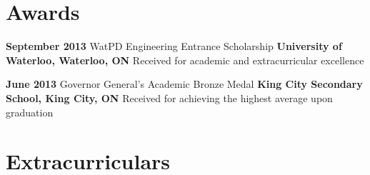 \documentclass[hidelinks]{kkurucz-cv}
\begin{document}

\vspace{-5.5mm}
\section{Awards}

\begin{entrylist}
\entry
{\textbf{September 2013}}
{WatPD Engineering Entrance Scholarship}
{\textbf{University of Waterloo, Waterloo, ON}}
{\small{Received for academic and extracurricular excellence}}
{\null\vspace{3mm}}

\entry
{\textbf{June 2013}}
{Governor General's Academic Bronze Medal}
{\textbf{King City Secondary School, King City, ON}}
{\small{Received for achieving the highest average upon graduation}}
{\null}
\end{entrylist}


\section{Extracurriculars}
\end{document}
